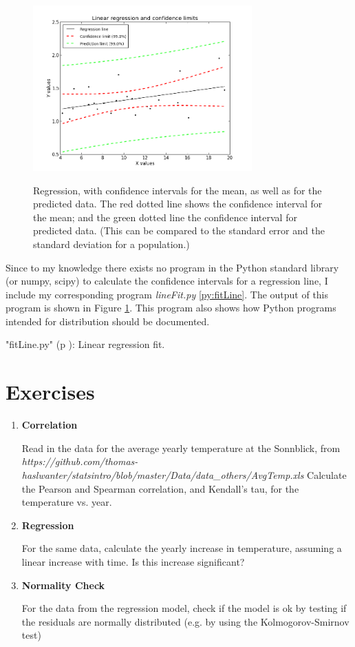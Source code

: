 \begin{figure}
  \centering
  \includegraphics[width=0.75\textwidth]{../Images/regression_wLegend.png}\\
  \caption{Regression, with confidence intervals for the mean, as well as for the predicted data. The red dotted line shows the confidence interval for the mean; and the green dotted line the confidence interval for predicted data. (This can be compared to the standard error and the standard deviation for a population.)} \label{fig:regline}
\end{figure}

Since to my knowledge there exists no program in the Python standard library (or numpy, scipy) to calculate the confidence intervals for a regression line, I include my corresponding program \emph{lineFit.py} \ref{py:fitLine}. The output of this program is shown in Figure \ref{fig:regline}. This program also shows how Python programs intended for distribution should be documented.

\PyImg "fitLine.py" (p \pageref{py:fitLine}): Linear regression fit.

\section{Exercises}

\begin{enumerate}
  \item \textbf{Correlation}

    Read in the data for the average yearly temperature at the Sonnblick, from     \emph{https://github.com/thomas-haslwanter/statsintro/blob/master/Data/data\_others/AvgTemp.xls}
    Calculate the Pearson and Spearman correlation, and Kendall's tau, for the temperature vs. year.

  \item \textbf{Regression}

    For the same data, calculate the yearly increase in temperature, assuming a linear increase with time.
    Is this increase significant?

  \item \textbf{Normality Check}

    For the data from the regression model, check if the model is ok by testing if the residuals are normally distributed (e.g. by using the Kolmogorov-Smirnov test)

\end{enumerate}


